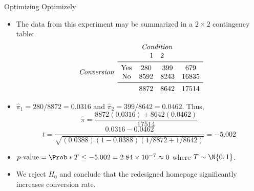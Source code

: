 \begin{Example}{Optimizing Optimizely}{}
\begin{itemize}
                  \centerline{$ H_0 $: $ \pi_1\ge \pi_2 $ versus $ H_\text{A} $: $ \pi_1<\pi_2 $}
            \item The data from this experiment may be summarized in a $ 2\times 2 $ contingency table:
                  \[
                        \begin{array}{c}
                              \\
                              \emph{Conversion}
                              \\
                        \end{array}
                        \begin{array}{ccc}
                                                         & \emph{Condition}           &                            \\
                                                         & \begin{matrix}
                                    1 & 2
                              \end{matrix} &                            \\
                              \midrule
                              \begin{matrix}
                                    \text{Yes} \\
                                    \text{No}
                              \end{matrix} & \begin{matrix}
                                    280  & 399  \\
                                    8592 & 8243
                              \end{matrix} & \begin{matrix}
                                    679 \\
                                    16835
                              \end{matrix} \\
                              \midrule
                                                         & \begin{matrix}
                                    8872 & 8642
                              \end{matrix} & 17514
                        \end{array}
                  \]
            \item $ \hat{\pi}_1=280/8872=0.0316 $ and $ \hat{\pi}_2=399/8642=0.0462 $. Thus,
                  \[ \hat{\pi}=\frac{8872(0.0316)+8642(0.0462)}{17514} \]
                  \[ t=\frac{0.0316-0.0462}{\sqrt{(0.0388)(1-0.0388)(1/8872+1/8642)}}=-5.002  \]
            \item $ p\text{-value}=\Prob*{T\le -5.002}=2.84\times 10^{-7}\approx 0 $ where $ T \sim \N{0,1} $.
            \item We reject $ H_0 $ and conclude that the redesigned homepage significantly
                  increases conversion rate.
      \end{itemize}
\end{Example}
